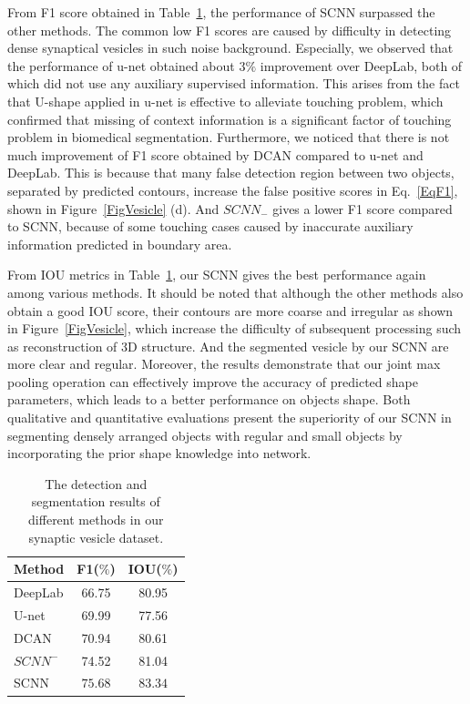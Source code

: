 From F1 score obtained in Table~\ref{tab:vesicle}, the performance of SCNN surpassed the other methods.
The common low F1 scores are caused by difficulty in detecting dense synaptical vesicles in such noise background.
Especially, we observed that the performance of u-net obtained about $3\%$ improvement over DeepLab, both of which did not use any auxiliary supervised information.
This arises from the fact that U-shape applied in u-net is effective to alleviate touching problem, which confirmed that missing of context information is a significant factor of touching problem in biomedical segmentation.
Furthermore, we noticed that there is not much improvement of F1 score obtained by DCAN compared to u-net and DeepLab.
This is because that many false detection region between two objects, separated by predicted contours, increase the false positive scores in Eq.~\ref{EqF1}, shown in Figure~\ref{FigVesicle} (d).
And $SCNN_{-}$ gives a lower F1 score compared to SCNN, because of some touching cases caused by inaccurate auxiliary information predicted in boundary area.

From IOU metrics in Table~\ref{tab:vesicle}, our SCNN gives the best performance again among various methods.
It should be noted that although the other methods also obtain a good IOU score, their contours are more coarse and irregular as shown in Figure~\ref{FigVesicle}, which increase the difficulty of subsequent processing such as reconstruction of 3D structure.
And the segmented vesicle by our SCNN are more clear and regular.
Moreover, the results demonstrate that our joint max pooling operation can effectively improve the accuracy of predicted shape parameters, which leads to a better performance on objects shape.
Both qualitative and quantitative evaluations present the superiority of our SCNN in segmenting densely arranged objects with regular and small objects by incorporating the prior shape knowledge into network.

\begin{table}
\begin{center}
\begin{tabular}{lcc}
\hline
Method & F1($\%$) & IOU($\%$) \\
\hline
DeepLab & 66.75 & 80.95 \\
U-net & 69.99 & 77.56 \\
DCAN & 70.94 & 80.61 \\
$SCNN^{-}$ & 74.52 & 81.04 \\
SCNN & $\mathbf{75.68}$ & $\mathbf{83.34}$\\
\hline
\end{tabular}
\end{center}
\caption{The detection and segmentation results of different methods in our synaptic vesicle dataset.}
\label{tab:vesicle}
\end{table}

